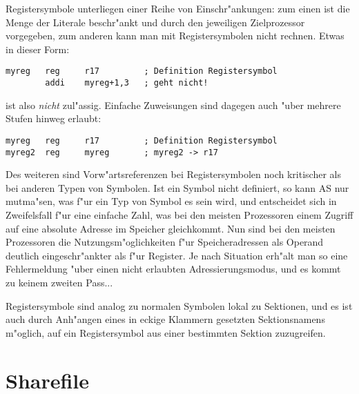 \documentclass[12pt,a4paper,twoside]{report}
\makeatletter
\newcommand{\ttindex}[1]{\index{#1@{\tt #1}}}
\makeatother
\begin{document}
Registersymbole unterliegen einer Reihe von Einschr"ankungen: zum einen ist die
Menge der Literale beschr"ankt und durch den jeweiligen Zielprozessor vorgegeben,
zum anderen kann man mit Registersymbolen nicht rechnen.  Etwas in dieser Form:
\begin{verbatim}
myreg   reg     r17         ; Definition Registersymbol
        addi    myreg+1,3   ; geht nicht!
\end{verbatim}
ist also {\em nicht} zul"assig.  Einfache Zuweisungen sind dagegen auch "uber mehrere
Stufen hinweg erlaubt:
\begin{verbatim}
myreg   reg     r17         ; Definition Registersymbol
myreg2  reg     myreg       ; myreg2 -> r17
\end{verbatim}
Des weiteren sind Vorw"artsreferenzen bei Registersymbolen noch kritischer als
bei anderen Typen von Symbolen.  Ist ein Symbol nicht definiert, so kann AS nur
mutma"sen, was f"ur ein Typ von Symbol es sein wird, und entscheidet sich in
Zweifelsfall f"ur eine einfache Zahl, was bei den meisten Prozessoren einem Zugriff
auf eine absolute Adresse im Speicher gleichkommt.  Nun sind bei den meisten
Prozessoren die Nutzungsm"oglichkeiten f"ur Speicheradressen als Operand deutlich
eingeschr"ankter als f"ur Register.  Je nach Situation erh"alt man so eine
Fehlermeldung "uber einen nicht erlaubten Adressierungsmodus, und es kommt zu keinem
zweiten Pass...

Registersymbole sind analog zu normalen Symbolen lokal zu Sektionen,
und es ist auch durch Anh"angen eines in eckige Klammern gesetzten Sektionsnamens
m"oglich, auf ein Registersymbol aus einer bestimmten Sektion zuzugreifen.


\section{Sharefile}
\label{ChapShareMain} \ttindex{SHARED}
\end{document}
